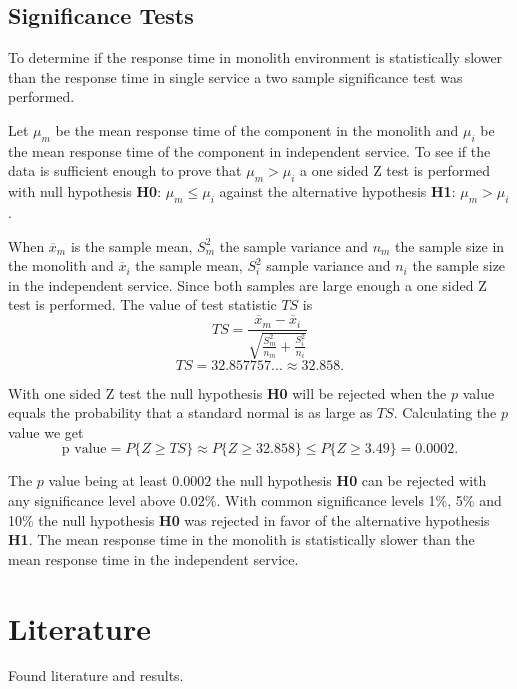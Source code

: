 \subsection{Significance Tests}
To determine if the response time in monolith environment is statistically slower than the response time in single service a two sample significance test was performed.

Let $\mu_m$ be the mean response time of the component in the monolith and $\mu_i$ be the mean response time of the component in independent service.
To see if the data is sufficient enough to prove that $\mu_m > \mu_i$ a one sided Z test is performed with null hypothesis \textbf{H0}: $\mu_m \leq \mu_i$ against the alternative hypothesis \textbf{H1}: $\mu_m > \mu_i$.

When $\overline{x}_m$ is the sample mean, $S_m^2$ the sample variance and $n_m$ the sample size in the monolith 
and $\overline{x}_i$ the sample mean, $S_i^2$ sample variance and $n_i$ the sample size in the independent service.
Since both samples are large enough a one sided Z test is performed.
The value of test statistic $TS$ is
\[
TS=\frac{\overline{x}_m-\overline{x}_i}{\sqrt{\frac{S_m^2}{n_m}+\frac{S_i^2}{n_i}}}
\]
\[
TS=32.857757... \approx 32.858
.\]
 
With one sided Z test the null hypothesis \textbf{H0} will be rejected when the $p$ value 
equals the probability that a standard normal is as large as $TS$. Calculating the $p$ value we get %
\[
\text{p value} = P\{Z\geq TS\} \approx P\{Z\geq 32.858\} \leq P\{Z\geq 3.49\} = 0.0002
.\]

The $p$ value being at least $0.0002$ the null hypothesis \textbf{H0} can be rejected with any significance level above $0.02\%$.
With common significance levels 1\%, 5\% and 10\% the null hypothesis \textbf{H0} was rejected in favor of the alternative hypothesis \textbf{H1}.
The mean response time in the monolith is statistically slower than the mean response time in the independent service.

\section{Literature}
Found literature and results.